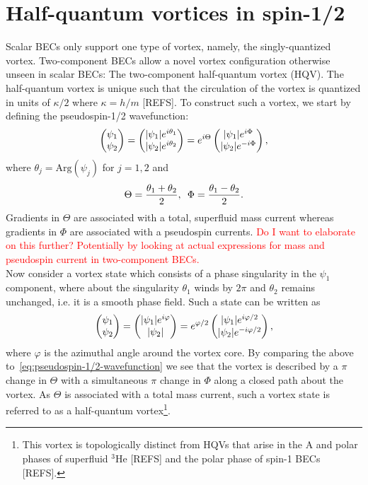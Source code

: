 \section{Half-quantum vortices in spin-1/2}
Scalar BECs only support one type of vortex, namely, the singly-quantized
vortex.
Two-component BECs allow a novel vortex configuration otherwise unseen in
scalar BECs: The two-component half-quantum 
vortex (HQV).
The half-quantum vortex is unique such that the circulation of the vortex is
quantized in units of $\kappa / 2$ where $\kappa=h/m$ [REFS].
To construct such a vortex, we start by defining the pseudospin-1/2
wavefunction:
\begin{equation}
    \begin{pmatrix}\psi_1\\\psi_2\end{pmatrix} 
    = \begin{pmatrix}|\psi_1|e^{i\theta_1}\\|\psi_2|e^{i\theta_2}\end{pmatrix}
    = e^{i\Theta}\begin{pmatrix}|\psi_1|e^{i\Phi}\\|\psi_2|e^{-i\Phi}\end{pmatrix},
    \label{eq:pseudospin-1/2-wavefunction}
\end{equation}
where $\theta_j=\mathrm{Arg}(\psi_j)$ for $j=1,2$ and
\begin{equation}
    \Theta = \frac{\theta_1 + \theta_2}{2}, \enskip 
    \Phi = \frac{\theta_1 - \theta_2}{2}.
    \label{eq:Theta-Phi}
\end{equation}
Gradients in $\Theta$ are associated with a total, superfluid mass current
whereas gradients in $\Phi$ are associated with a pseudospin currents.
\textcolor{red}{Do I want to elaborate on this further? Potentially by looking
at actual expressions for mass and pseudospin current in two-component BECs.} \\
Now consider a vortex state which consists of a phase singularity in the $\psi_1$
component, where about the singularity $\theta_1$ winds by $2\pi$ and $\theta_2$
remains unchanged, i.e. it is a smooth phase field.
Such a state can be written as
\begin{equation}
    \begin{pmatrix}\psi_1\\\psi_2\end{pmatrix} 
    = \begin{pmatrix}|\psi_1|e^{i\varphi}\\|\psi_2|\end{pmatrix}
    = e^{\varphi/2}\begin{pmatrix}|\psi_1|e^{i\varphi/2}\\|\psi_2|e^{-i\varphi/2}\end{pmatrix},
\end{equation}
where $\varphi$ is the azimuthal angle around the vortex core.
By comparing the above to~\eqref{eq:pseudospin-1/2-wavefunction} we see that
the vortex is described by a $\pi$ change in $\Theta$ with a simultaneous $\pi$
change in $\Phi$ along a closed path about the vortex.
As $\Theta$ is associated with a total mass current, such a vortex state is
referred to as a half-quantum vortex\footnote{This vortex is topologically
distinct from HQVs that arise in the A and polar phases of superfluid $^3$He
[REFS] and the polar phase of spin-1 BECs [REFS].}.
\par

